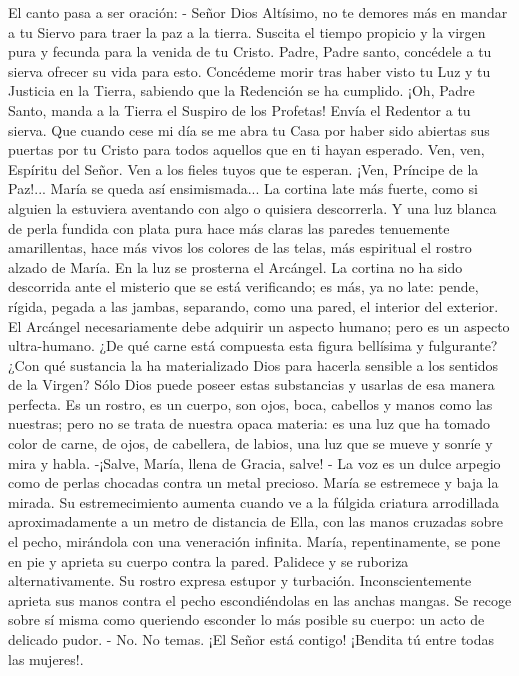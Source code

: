 \documentclass[12pt]{book} %
\begin{document}
El canto pasa a ser oración: 
- Señor Dios Altísimo, no te demores más en mandar a tu Siervo para traer la paz a la tierra. Suscita el tiempo propicio y la virgen pura y fecunda para la venida de tu Cristo. Padre, Padre santo, concédele a tu sierva ofrecer su vida para esto. Concédeme morir tras haber visto tu Luz y tu Justicia en la Tierra, sabiendo que la Redención se ha cumplido. ¡Oh, Padre Santo, manda a la Tierra el Suspiro de los Profetas! Envía el Redentor a tu sierva. Que cuando cese mi día se me abra tu Casa por haber sido abiertas sus puertas por tu Cristo para todos aquellos que en ti hayan esperado. Ven, ven, Espíritu del Señor. Ven a los fieles tuyos que te esperan. ¡Ven, Príncipe de la Paz!... 
María se queda así ensimismada... 
La cortina late más fuerte, como si alguien la estuviera aventando con algo o quisiera descorrerla. Y una luz blanca de 
perla fundida con plata pura hace más claras las paredes tenuemente amarillentas, hace más vivos los colores de las telas, más espiritual el rostro alzado de María. En la luz se prosterna el Arcángel. La cortina no ha sido descorrida ante el misterio que se está verificando; es más, ya no late: pende, rígida, pegada a las jambas, separando, como una pared, el interior del exterior. 
El Arcángel necesariamente debe adquirir un aspecto humano; pero es un aspecto ultra-humano. ¿De qué carne está 
compuesta esta figura bellísima y fulgurante? ¿Con qué sustancia la ha materializado Dios para hacerla sensible a los sentidos de la Virgen? Sólo Dios puede poseer estas substancias y usarlas de esa manera perfecta. Es un rostro, es un cuerpo, son ojos, boca, cabellos y manos como las nuestras; pero no se trata de nuestra opaca materia: es una luz que ha tomado color de carne, de ojos, de cabellera, de labios, una luz que se mueve y sonríe y mira y habla. 
-¡Salve, María, llena de Gracia, salve! - La voz es un dulce arpegio como de perlas chocadas contra un metal precioso. 
María se estremece y baja la mirada. Su estremecimiento aumenta cuando ve a la fúlgida criatura arrodillada aproximadamente a un metro de distancia de Ella, con las manos cruzadas sobre el pecho, mirándola con una veneración infinita. 
María, repentinamente, se pone en pie y aprieta su cuerpo contra la pared. Palidece y se ruboriza alternativamente. Su rostro expresa estupor y turbación. Inconscientemente aprieta sus manos contra el pecho escondiéndolas en las anchas mangas. Se recoge sobre sí misma como queriendo esconder lo más posible su cuerpo: un acto de delicado pudor. 
- No. No temas. ¡El Señor está contigo! ¡Bendita tú entre todas las mujeres!. 
\end{document}
